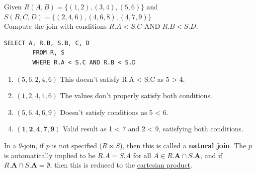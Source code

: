     \begin{example}
      \label{ex:conditional-join-query}
      Given $R(A,B) = \{(1,2), (3,4), (5,6)\}$ and\\
      $S(B,C,D) = \{(2,4,6), (4,6,8), (4,7,9)\}$\\
      Compute the join with conditions $R.A < S.C$ AND $R.B < S.D$.

      \begin{lstlisting}[basicstyle=\ttfamily]
        SELECT A, R.B, S.B, C, D
        FROM R, S
        WHERE R.A < S.C AND R.B < S.D
      \end{lstlisting}

      \begin{enumerate}
        \item $(5,6,2,4,6)$ This doesn't satisfy R.A < S.C as 5 > 4.
        
        \item $(1,2,4,4,6)$ The values don't properly satisfy both conditions.
        
        \item $(5,6,4,6,9)$ Doesn't satisfy conditions as 5 < 6.
        
        \item $\mathbf{(1,2,4,7,9)}$ Valid result as 1 < 7 and 2 < 9, satisfying both conditions.
      \end{enumerate}
    \end{example}

    \begin{definition}
      \label{def:natural-inner-join}
      In a $\theta$-join, if $p$ is not specified ($R \bowtie S$), then this is called a \textbf{natural join}. The $p$ is automatically implied to be $R.A = S.A$ for all $A \in R.\mathbf{A} \cap S.\mathbf{A}$, and if $R.\mathbf{A} \cap S.\mathbf{A} = \emptyset$, then this is reduced to the \hyperref[def:cartesian-product]{cartesian product}. 
    \end{definition}

